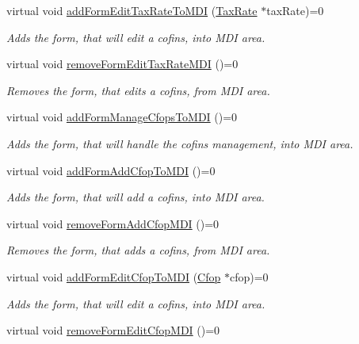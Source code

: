 \begin{DoxyCompactItemize}
virtual void \hyperlink{class_i_main_window_ab426bef03451b41a34a3125685951a98}{add\-Form\-Edit\-Tax\-Rate\-To\-M\-D\-I} (\hyperlink{class_tax_rate}{\-Tax\-Rate} $\ast$tax\-Rate)=0
\begin{DoxyCompactList}\small\item\em \-Adds the form, that will edit a cofins, into \-M\-D\-I area. \end{DoxyCompactList}\item 
virtual void \hyperlink{class_i_main_window_a2f6d47e171d622a6d17be124821352bd}{remove\-Form\-Edit\-Tax\-Rate\-M\-D\-I} ()=0
\begin{DoxyCompactList}\small\item\em \-Removes the form, that edits a cofins, from \-M\-D\-I area. \end{DoxyCompactList}\item 
virtual void \hyperlink{class_i_main_window_aea3adb541f62fa29af136029324ccc9c}{add\-Form\-Manage\-Cfops\-To\-M\-D\-I} ()=0
\begin{DoxyCompactList}\small\item\em \-Adds the form, that will handle the cofins management, into \-M\-D\-I area. \end{DoxyCompactList}\item 
virtual void \hyperlink{class_i_main_window_aebf02f05193d0a792cabca2aba84efc4}{add\-Form\-Add\-Cfop\-To\-M\-D\-I} ()=0
\begin{DoxyCompactList}\small\item\em \-Adds the form, that will add a cofins, into \-M\-D\-I area. \end{DoxyCompactList}\item 
virtual void \hyperlink{class_i_main_window_a2e6a148dfab986283c1554949c68ac31}{remove\-Form\-Add\-Cfop\-M\-D\-I} ()=0
\begin{DoxyCompactList}\small\item\em \-Removes the form, that adds a cofins, from \-M\-D\-I area. \end{DoxyCompactList}\item 
virtual void \hyperlink{class_i_main_window_a97090176a66059bd3b477dccdf18ceab}{add\-Form\-Edit\-Cfop\-To\-M\-D\-I} (\hyperlink{class_cfop}{\-Cfop} $\ast$cfop)=0
\begin{DoxyCompactList}\small\item\em \-Adds the form, that will edit a cofins, into \-M\-D\-I area. \end{DoxyCompactList}\item 
virtual void \hyperlink{class_i_main_window_a2827c80d526c9b4ad415080d4c3e5a56}{remove\-Form\-Edit\-Cfop\-M\-D\-I} ()=0

\end{DoxyCompactItemize}
